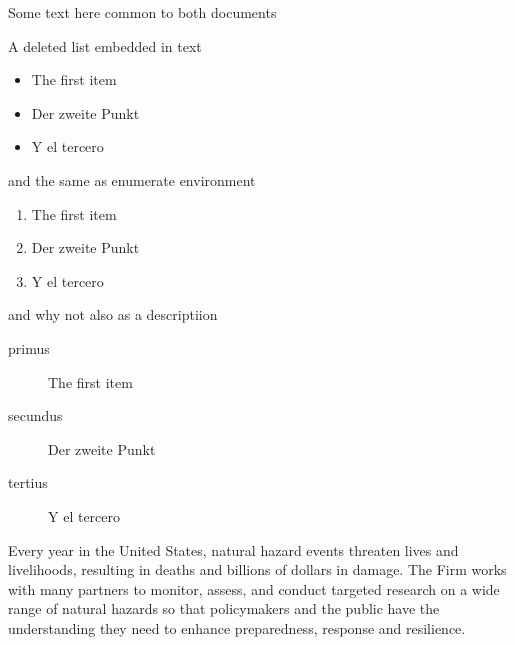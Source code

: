 \documentclass{article}
\begin{document}
Some text here common to both documents

A deleted list embedded in text
\begin{itemize}
 \item The first item
 \item Der zweite Punkt
 \item Y el tercero
\end{itemize}
and the same as enumerate environment
\begin{enumerate}
 \item The first item
 \item Der zweite Punkt
 \item Y el tercero
\end{enumerate}
and why not also as a descriptiion
\begin{description}
 \item[primus] The first item
 \item[secundus] Der zweite Punkt
 \item[tertius] Y el tercero
\end{description}



Every year in the United States, natural hazard events threaten lives and livelihoods, resulting in deaths and billions of dollars in damage. The Firm works with many partners to monitor, assess, and conduct targeted research on a wide range of natural hazards so that policymakers and the public have the understanding they need to enhance preparedness, response and resilience.
\end{document}
